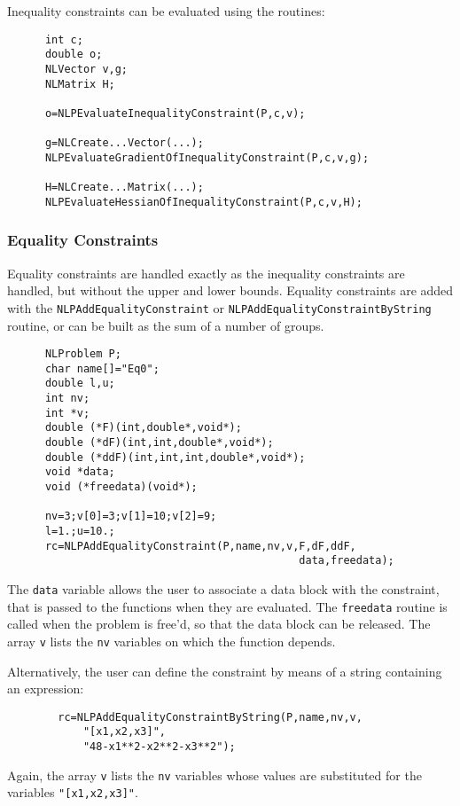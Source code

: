 \documentclass[12pt]{article}
\begin{document}
     Inequality constraints can be evaluated using the routines:
     \begin{verbatim}
      int c;
      double o;
      NLVector v,g;
      NLMatrix H;

      o=NLPEvaluateInequalityConstraint(P,c,v);

      g=NLCreate...Vector(...);
      NLPEvaluateGradientOfInequalityConstraint(P,c,v,g);

      H=NLCreate...Matrix(...);
      NLPEvaluateHessianOfInequalityConstraint(P,c,v,H);
     \end{verbatim}

   \subsubsection{Equality Constraints}
     Equality constraints are handled exactly as the inequality constraints are handled, but without the
     upper and lower bounds. Equality constraints are added with the {\tt NLPAdd\-Equality\-Constraint}
     or {\tt NLPAdd\-Equality\-Constraint\-ByString} routine, or can be built as the sum of a number of groups.
     \begin{verbatim}
      NLProblem P;
      char name[]="Eq0";
      double l,u;
      int nv;
      int *v;
      double (*F)(int,double*,void*);
      double (*dF)(int,int,double*,void*);
      double (*ddF)(int,int,int,double*,void*);
      void *data;
      void (*freedata)(void*);

      nv=3;v[0]=3;v[1]=10;v[2]=9;
      l=1.;u=10.;
      rc=NLPAddEqualityConstraint(P,name,nv,v,F,dF,ddF,
                                              data,freedata);

     \end{verbatim}
     The {\tt data} variable allows the user to associate a data block with the constraint, that is passed to the
     functions when they are evaluated. The {\tt freedata} routine is called when the problem is free'd, so that
     the data block can be released. The array {\tt v} lists the {\tt nv} variables on which the function depends.

     Alternatively, the user can define the constraint by means of a string containing an expression:
     \begin{verbatim}
        rc=NLPAddEqualityConstraintByString(P,name,nv,v,
            "[x1,x2,x3]",
            "48-x1**2-x2**2-x3**2");
     \end{verbatim}
     Again, the array {\tt v} lists the {\tt nv} variables whose values are substituted for the variables
     {\tt "[x1,x2,x3]"}.
\end{document}
